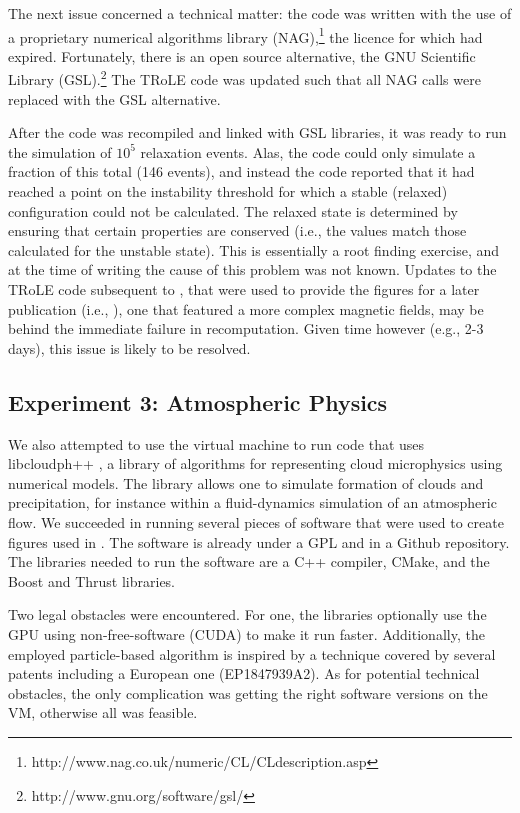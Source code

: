 The next issue concerned a technical matter: the code was written with the use of a proprietary numerical algorithms
library (NAG),\footnote{http://www.nag.co.uk/numeric/CL/CLdescription.asp} the licence for which had expired. Fortunately, there is an open source alternative, the GNU Scientific
Library (GSL).\footnote{http://www.gnu.org/software/gsl/} The TRoLE code was updated such that all NAG calls were replaced with the GSL alternative. 

After the code was recompiled and linked with GSL libraries, it was ready to run the simulation of $10^5$ relaxation
events. Alas, the code could only simulate a fraction of this total (146 events), and instead the code reported
that it had reached a point on the instability threshold for which a stable (relaxed) configuration could not be calculated.
The relaxed state is determined by ensuring that certain properties are conserved (i.e., the values match those
calculated for the unstable state). This is essentially a root finding exercise, and at the time of writing
the cause of this problem was not known. Updates to the TRoLE code subsequent to \cite{bareford2010nanoflare}, that were
used to provide the figures for a later publication (i.e., \cite{bareford2011flare}), one that featured a more complex magnetic
fields, may be behind the immediate failure in recomputation. Given time however (e.g., 2-3 days), this issue
is likely to be resolved. 

\subsection*{Experiment 3: Atmospheric Physics}

We also attempted to use the virtual machine to run code that uses libcloudph++ \cite{arabas2013libcloud}, a library of algorithms
for representing cloud microphysics using numerical models. The library allows one to simulate formation of clouds and precipitation, for instance within a fluid-dynamics simulation of an atmospheric flow. We succeeded in running several pieces of software that were used to create figures used in \cite{arabas2013libcloud}. The software is already under a GPL and in a Github repository. The libraries needed to run the software are a C++ compiler, CMake, and the Boost and Thrust libraries.

Two legal obstacles were encountered. For one, the libraries optionally use the GPU using non-free-software (CUDA) to make it run faster. Additionally, the employed particle-based algorithm is inspired by a technique covered by several patents including a European one (EP1847939A2). As for potential technical obstacles, the only complication was getting the right software versions on the VM, otherwise all was feasible.

